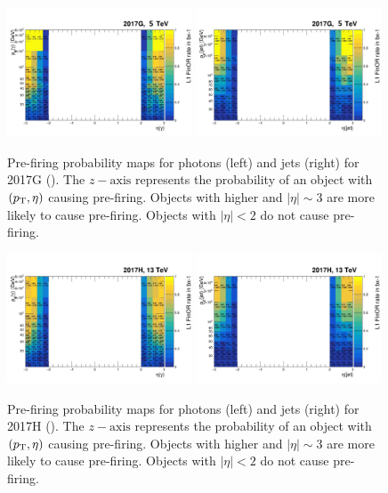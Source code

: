 \begin{figure}[htbp]
\centering
\includegraphics[width=0.49\textwidth]{plots/Prefire/L1prefiring_photonpt_2017G.pdf}
\includegraphics[width=0.49\textwidth]{plots/Prefire/L1prefiring_jetpt_2017G.pdf}
\caption{Pre-firing probability maps for photons (left) and jets (right) for 2017G (\sg). The $z-\mathrm{axis}$ represents the probability of an object with $(p_{\mathrm{T}},\eta)$ causing pre-firing. Objects with higher \pt and $|\eta| \sim 3$ are more likely to cause pre-firing. Objects with $|\eta| < 2$ do not cause pre-firing.}
\label{fig:prefire:2017G}
\end{figure}

\begin{figure}[htbp]
\centering
\includegraphics[width=0.49\textwidth]{plots/Prefire/L1prefiring_photonpt_2017H.pdf}
\includegraphics[width=0.49\textwidth]{plots/Prefire/L1prefiring_jetpt_2017H.pdf}
\caption{Pre-firing probability maps for photons (left) and jets (right) for 2017H (\sh). The $z-\mathrm{axis}$ represents the probability of an object with $(p_{\mathrm{T}},\eta)$ causing pre-firing. Objects with higher \pt and $|\eta| \sim 3$ are more likely to cause pre-firing. Objects with $|\eta| < 2$ do not cause pre-firing.}
\label{fig:prefire:2017H}
\end{figure}